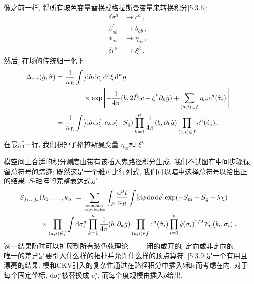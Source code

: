 像之前一样, 将所有玻色变量替换成格拉斯曼变量来转换积分\eqref{5.3.6}:
\begin{subequations} \label{5.3.7}
\begin{align}
\delta \sigma^{a}  &\rightarrow c^{a} \:, \label{5.3.7a} \\
\beta_{a b}^{\prime} & \rightarrow b_{a b} \:,  \label{5.3.7b}\\
x_{a i}  &\rightarrow \eta_{a i}  \:,\label{5.3.7c} \\
\delta t^{k}  &\rightarrow \xi^{k} \:. \label{5.3.7d}
\end{align}	
\end{subequations}
然后, 在场的传统归一化下
	\begin{align}
		\Delta_{\mathrm{FP}}(\hat{g}, \hat{\sigma})&= \frac{1}{n_{R}} \int[\mathrm{d} b\, \mathrm{d} c] \,\mathrm{d}^{\mu} \xi \,\mathrm{d}^{\kappa} \eta \nonumber \\
		&\qquad \qquad \times \exp \Biggl[-\frac{1}{4 \pi}(b, 2 \hat{P}_{1} c-\xi^{k} \partial_{k} \hat{g})
		+\sum_{(a, i) \in f} \eta_{a i} c^{a}(\hat{\sigma}_{i})\Biggr]  \nonumber \\
		&= \frac{1}{n_{R}} \int[\mathrm{d} b\, \mathrm{d} c] \: \exp (-S_{\mathrm{g}}) \prod_{k=1}^{\mu} \frac{1}{4 \pi}(b, \partial_{k} \hat{g}) 
		\prod_{(a, i) \in f} c^{a}(\hat{\sigma}_{i}) \:. \label{5.3.8}
	\end{align}
在最后一行, 我们积掉了格拉斯曼变量 $\eta_{a i}$和 $\xi^{k}$.

模空间上合适的积分测度由带有该插入鬼路径积分生成. 我们不试图在中间步骤保留总符号的踪迹; 既然这是一个雅可比行列式, 我们可以暗中选择总符号以给出正的结果. 
$S$-矩阵的完整表达式是
	\begin{align}
		&S_{j_{1} \ldots j_{n}}(k_{1}, \ldots, k_{n})
		=\sum_{ \text{compact} \atop \text{topologies} } \int_{F} \frac{\mathrm{d}^{\mu} t}{n_{R}} \int[\mathrm{d} \phi \,\mathrm{d} b\, \mathrm{d} c] \exp (-S_{\mathrm{m}}-S_{\mathrm{g}}-\lambda \chi) \nonumber  \\
		&\qquad \quad \times \prod_{(a, i) \notin f} \int \mathrm{d} \sigma_{i}^{a} \prod_{k=1}^{\mu} \frac{1}{4 \pi}(b, \partial_{k} \hat{g}) 
		\prod_{(a, i) \in f} c^{a}(\hat{\sigma}_{i}) \prod_{i=1}^{n} \hat{g}(\sigma_{i})^{1 / 2} \mathscr{V}_{j_{i}}(k_{i}, \sigma_{i})\:.\label{5.3.9}
	\end{align}
这一结果随时可以扩展到所有玻色弦理论 —— 闭的或开的, 定向或非定向的 —— 唯一的差异是要引入什么样的拓扑并允许什么样的顶点算符. \eqref{5.3.9}是一个有用且漂亮的结果. 模和CKV引入的复杂性通过在路径积分中插入$b$和$c$而考虑在内. 对于每个固定坐标, $\mathrm{d} \sigma_{i}^{a}$被替换成 $c_{i}^{a}$, 而每个度规模由插入$b$给出.

